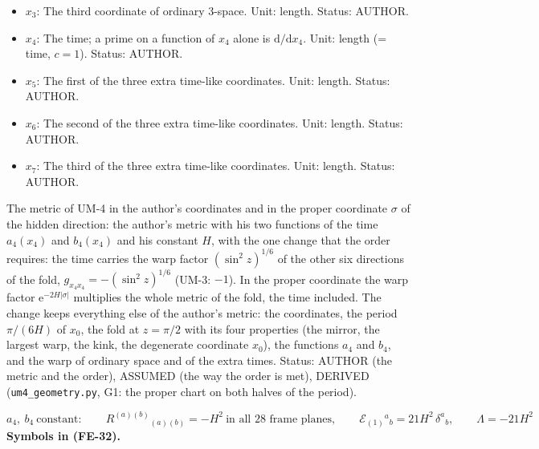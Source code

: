 \documentclass[
  10pt,
]{article}
\begin{document}
\begin{itemize}
  Status: AUTHOR.
\item
  \(x_3\): The third coordinate of ordinary 3-space. Unit: length.
  Status: AUTHOR.
\item
  \(x_4\): The time; a prime on a function of \(x_4\) alone is
  \(\mathrm{d}/\mathrm{d}x_4\). Unit: length (= time, \(c = 1\)).
  Status: AUTHOR.
\item
  \(x_5\): The first of the three extra time-like coordinates. Unit:
  length. Status: AUTHOR.
\item
  \(x_6\): The second of the three extra time-like coordinates. Unit:
  length. Status: AUTHOR.
\item
  \(x_7\): The third of the three extra time-like coordinates. Unit:
  length. Status: AUTHOR.
\end{itemize}

The metric of UM-4 in the author's coordinates and in the proper
coordinate \(\sigma\) of the hidden direction: the author's metric with
his two functions of the time \(a_4(x_4)\) and \(b_4(x_4)\) and his
constant \(H\), with the one change that the order requires: the time
carries the warp factor \((\sin^2z)^{1/6}\) of the other six directions
of the fold, \(g_{x_4x_4} = -(\sin^2z)^{1/6}\) (UM-3: \(-1\)). In the
proper coordinate the warp factor \(\mathrm{e}^{-2H\lvert\sigma\rvert}\)
multiplies the whole metric of the fold, the time included. The change
keeps everything else of the author's metric: the coordinates, the
period \(\pi/(6H)\) of \(x_0\), the fold at \(z = \pi/2\) with its four
properties (the mirror, the largest warp, the kink, the degenerate
coordinate \(x_0\)), the functions \(a_4\) and \(b_4\), and the warp of
ordinary space and of the extra times. Status: AUTHOR (the metric and
the order), ASSUMED (the way the order is met), DERIVED
(\texttt{um4\_geometry.py}, G1: the proper chart on both halves of the
period).

\[
a_4,\ b_4\ \text{constant}:\qquad R^{(a)(b)}{}_{(a)(b)} = -H^2\ \text{in all 28 frame planes},\qquad
\mathcal{E}_{(1)}{}^a{}_b = 21H^2\,\delta^a{}_b,\qquad \Lambda = -21H^2 \tag{FE-32}
\] \textbf{Symbols in (FE-32).}
\end{document}
